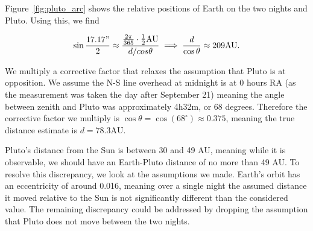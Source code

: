 \documentclass{article}
\begin{document}
    Figure~\ref{fig:pluto_arc} shows the relative positions of Earth on the two nights and Pluto. Using this, we find 

    \begin{align}
        \sin\frac{17.17"}{2} \approx \frac{\frac{2\pi}{365} \cdot \frac{1}{2}\text{AU}}{d/cos\theta} \implies \frac{d}{\cos\theta} \approx 209 \text{AU}.
    \end{align}

    We multiply a corrective factor that relaxes the assumption that Pluto is at opposition. We assume the N-S line overhead at midnight is at 0 hours RA (as the measurement was taken the day after September 21) meaning the angle between zenith and Pluto was approximately 4h32m, or 68 degrees. Therefore the corrective factor we multiply is $\cos\theta = \cos(68^\circ) \approx 0.375$, meaning the true distance estimate is $d = 78.3 \text{AU}$.

    Pluto's distance from the Sun is between 30 and 49 AU, meaning while it is observable, we should have an Earth-Pluto distance of no more than 49 AU. To resolve this discrepancy, we look at the assumptions we made. Earth's orbit has an eccentricity of around 0.016, meaning over a single night the assumed distance it moved relative to the Sun is not significantly different than the considered value. The remaining discrepancy could be addressed by dropping the assumption that Pluto does not move between the two nights.
\end{document}
